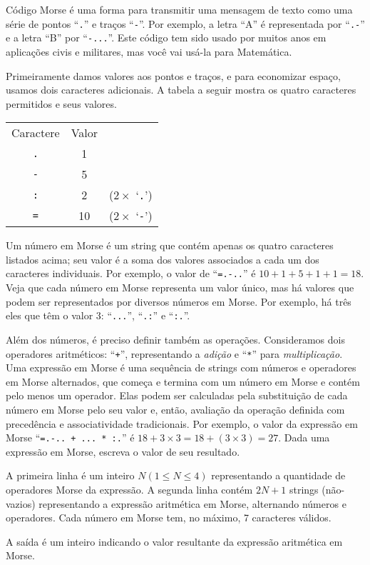 %
%
%
%

Código Morse é uma forma para transmitir uma mensagem de texto como uma série de pontos ``\texttt{.}'' e traços ``\texttt{-}''. Por exemplo, a letra ``A'' é representada por ``\texttt{.-}'' e a letra ``B'' por ``\texttt{-...}''. Este código tem sido usado por muitos anos em aplicações civis e militares, mas você vai usá-la para Matemática.

Primeiramente damos valores aos pontos e traços, e para economizar espaço, usamos dois caracteres adicionais. A tabela a seguir mostra os quatro caracteres permitidos e seus valores.

\begin{center}%
	\begin{tabular}{c | c l}%
	Caractere  & Valor & \\\cline{1-2}%
	\texttt{.} & 1     & \\%
	\texttt{-} & 5     & \\%
	\texttt{:} & 2     & ($2\times$ `\texttt{.}')\\%
	\texttt{=} & 10    & ($2\times$ `\texttt{-}')%
	\end{tabular}
\end{center}%

Um número em Morse é um string que contém apenas os quatro caracteres listados acima; seu valor é a soma dos valores associados a cada um dos caracteres individuais. Por exemplo, o valor de \mbox{``\texttt{=.-..}''} é \mbox{$10+1+5+1+1 = 18$}. Veja que cada número em Morse representa um valor único, mas há valores que podem ser representados por diversos números em Morse. Por exemplo, há três eles que têm o valor 3: ``\texttt{...}'', ``\texttt{.:}'' e ``\texttt{:.}''.

Além dos números, é preciso definir também as operações. Consideramos dois operadores aritméticos:  ``\texttt{+}'', representando a \emph{adição} e ``\texttt{*}'' para \emph{multiplicação}. Uma expressão em Morse é uma sequência de strings com números e operadores em Morse alternados, que começa e termina com um número em Morse e contém pelo menos um operador. Elas podem ser calculadas pela substituição de cada número em Morse pelo seu valor e, então, avaliação da operação definida com precedência e associatividade tradicionais. Por exemplo, o valor da expressão em Morse  ``\texttt{=.-.. + ... * :.}'' é \mbox{$18 + 3 \times 3 = 18 + (3 \times 3) = 27$}. Dada uma expressão em Morse, escreva o valor de seu resultado.


\Entrada%
A primeira linha é um inteiro $N (1 \leq N \leq 4)$ representando a quantidade de operadores Morse da expressão. A segunda linha contém $2N + 1$ strings (não-vazios) representando a expressão aritmética em Morse, alternando números e operadores. Cada número em Morse tem, no máximo, 7 caracteres válidos.

\Saida%
A saída é um inteiro indicando o valor resultante da expressão aritmética em Morse.

%
